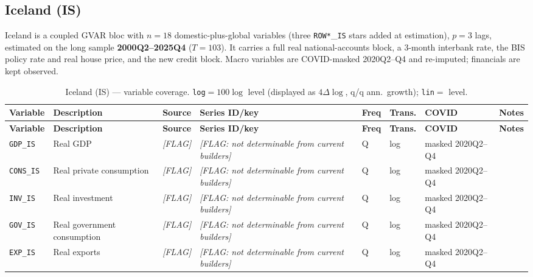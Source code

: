 \subsection{Iceland (IS)}\label{sec:data:IS}
Iceland is a coupled GVAR bloc with $n=18$ domestic-plus-global variables
(three \texttt{ROW*}\_\texttt{IS} stars added at estimation), $p=3$ lags,
estimated on the long sample \textbf{2000Q2--2025Q4} ($T=103$).  It
carries a full real national-accounts block, a 3-month interbank rate, the
BIS policy rate and real house price, and the new credit block.  Macro
variables are COVID-masked 2020Q2--Q4 and re-imputed; financials are kept
observed.

{\footnotesize
\begin{longtable}{@{}p{2.0cm}p{2.7cm}p{1.4cm}p{2.8cm}p{0.7cm}p{0.85cm}p{1.5cm}p{2.3cm}@{}}
\caption{Iceland (IS) --- variable coverage.  \texttt{log}$=100\log$ level
(displayed as $4\Delta\log$, q/q ann.\ growth); \texttt{lin}$=$ level.}
\label{tab:data:IS}\\
\toprule
\textbf{Variable} & \textbf{Description} & \textbf{Source} & \textbf{Series ID/key} & \textbf{Freq} & \textbf{Trans.} & \textbf{COVID} & \textbf{Notes} \\
\midrule \endfirsthead
\toprule
\textbf{Variable} & \textbf{Description} & \textbf{Source} & \textbf{Series ID/key} & \textbf{Freq} & \textbf{Trans.} & \textbf{COVID} & \textbf{Notes} \\
\midrule \endhead
\bottomrule \endfoot
\texttt{GDP\_IS}    & Real GDP                      & \textit{[FLAG]} & \textit{[FLAG: not determinable from current builders]} & Q & log & masked 2020Q2--Q4 & \\
\texttt{CONS\_IS}   & Real private consumption      & \textit{[FLAG]} & \textit{[FLAG: not determinable from current builders]} & Q & log & masked 2020Q2--Q4 & \\
\texttt{INV\_IS}    & Real investment               & \textit{[FLAG]} & \textit{[FLAG: not determinable from current builders]} & Q & log & masked 2020Q2--Q4 & \\
\texttt{GOV\_IS}    & Real government consumption   & \textit{[FLAG]} & \textit{[FLAG: not determinable from current builders]} & Q & log & masked 2020Q2--Q4 & \\
\texttt{EXP\_IS}    & Real exports                  & \textit{[FLAG]} & \textit{[FLAG: not determinable from current builders]} & Q & log & masked 2020Q2--Q4 & \\

\end{longtable}}
